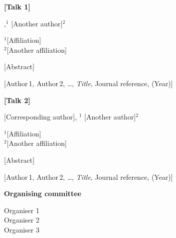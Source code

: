 \documentclass{article}
\begin{document}
\begin{flushleft}
    \textbf{[Talk 1]}
    \vspace{0.3cm}

    ,$^{1}$
    [Another author]$^2$\\
    \vspace{0.3cm}

    \small  
    $^1$[Affiliation]\\
    $^2$[Another affiliation]
    \normalsize
    \vspace{0.3cm}
    
    [Abstract]
    \vspace{0.3cm}
    
    \footnotesize
    [Author$\,$1, Author$\,$2, \dots,  \emph{Title}, Journal reference, (Year)]\\
\end{flushleft} 
\vspace{0.5cm}

\begin{flushleft}
    \textbf{[Talk 2]}
    \vspace{0.3cm}

    [Corresponding author], $^{1}$
    [Another author]$^2$\\
    \vspace{0.3cm}

    \small  
    $^1$[Affiliation]\\
    $^2$[Another affiliation]
    \normalsize
    \vspace{0.3cm}
    
    [Abstract]
    \vspace{0.3cm}
    
    \footnotesize
    [Author$\,$1, Author$\,$2, \dots,  \emph{Title}, Journal reference, (Year)]\\
\end{flushleft} 
\vspace{0.5cm}

\begin{center}
    \large \textbf{Organising committee}
    \vspace{0.3cm}
    \normalsize
    
    Organiser 1 \\[3pt]
    Organiser 2 \\[3pt]
    Organiser 3
\end{center}
\end{document}
